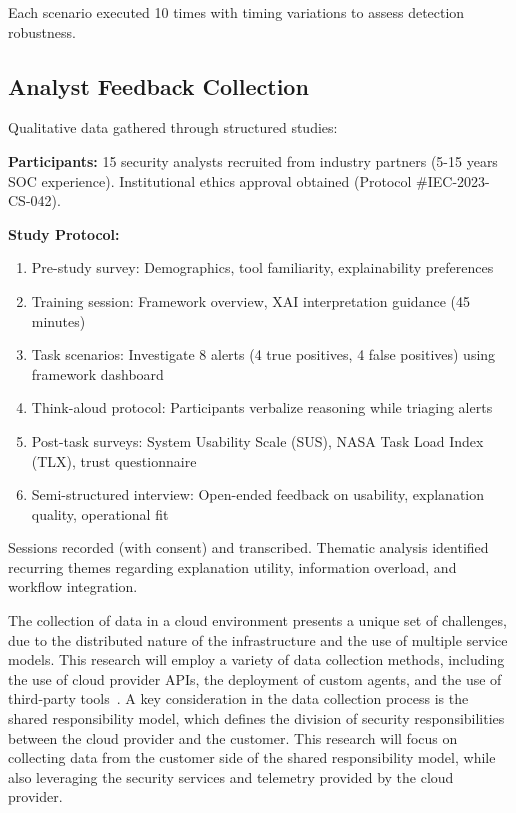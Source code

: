 Each scenario executed 10 times with timing variations to assess detection robustness.

\subsection{Analyst Feedback Collection}
Qualitative data gathered through structured studies:

\textbf{Participants:} 15 security analysts recruited from industry partners (5-15 years SOC experience). Institutional ethics approval obtained (Protocol \#IEC-2023-CS-042).

\textbf{Study Protocol:}
\begin{enumerate}
    \item Pre-study survey: Demographics, tool familiarity, explainability preferences
    \item Training session: Framework overview, XAI interpretation guidance (45 minutes)
    \item Task scenarios: Investigate 8 alerts (4 true positives, 4 false positives) using framework dashboard
    \item Think-aloud protocol: Participants verbalize reasoning while triaging alerts
    \item Post-task surveys: System Usability Scale (SUS), NASA Task Load Index (TLX), trust questionnaire
    \item Semi-structured interview: Open-ended feedback on usability, explanation quality, operational fit
\end{enumerate}

Sessions recorded (with consent) and transcribed. Thematic analysis identified recurring themes regarding explanation utility, information overload, and workflow integration.

The collection of data in a cloud environment presents a unique set of challenges, due to the distributed nature of the infrastructure and the use of multiple service models. This research will employ a variety of data collection methods, including the use of cloud provider APIs, the deployment of custom agents, and the use of third-party tools~\cite{salvationdata2024datacollection}. A key consideration in the data collection process is the shared responsibility model, which defines the division of security responsibilities between the cloud provider and the customer. This research will focus on collecting data from the customer side of the shared responsibility model, while also leveraging the security services and telemetry provided by the cloud provider.

